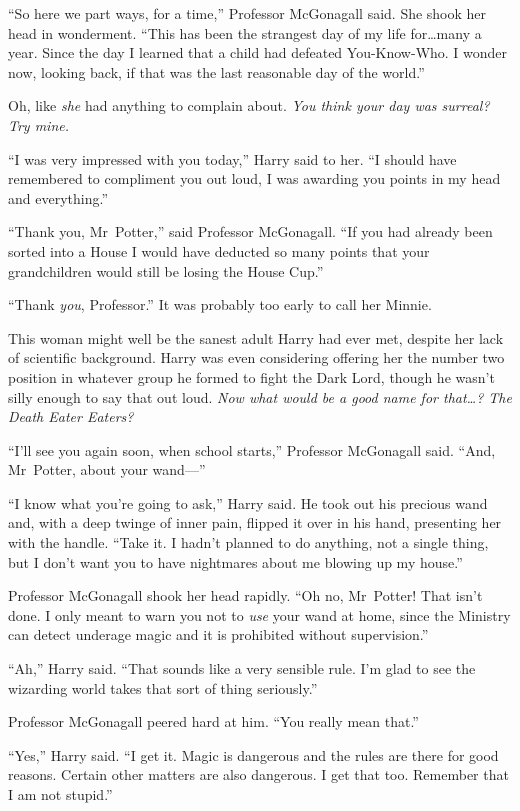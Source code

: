 “So here we part ways, for a time,” Professor McGonagall said. She shook her head in wonderment. “This has been the strangest day of my life for…many a year. Since the day I learned that a child had defeated You-Know-Who. I wonder now, looking back, if that was the last reasonable day of the world.”

Oh, like \emph{she} had anything to complain about. \emph{You think your day was surreal? Try mine.}

“I was very impressed with you today,” Harry said to her. “I should have remembered to compliment you out loud, I was awarding you points in my head and everything.”

“Thank you, Mr~Potter,” said Professor McGonagall. “If you had already been sorted into a House I would have deducted so many points that your grandchildren would still be losing the House Cup.”

“Thank \emph{you}, Professor.” It was probably too early to call her Minnie.

This woman might well be the sanest adult Harry had ever met, despite her lack of scientific background. Harry was even considering offering her the number two position in whatever group he formed to fight the Dark Lord, though he wasn’t silly enough to say that out loud. \emph{Now what would be a good name for that…? The Death Eater Eaters?}

“I’ll see you again soon, when school starts,” Professor McGonagall said. “And, Mr~Potter, about your wand—”

“I know what you’re going to ask,” Harry said. He took out his precious wand and, with a deep twinge of inner pain, flipped it over in his hand, presenting her with the handle. “Take it. I hadn’t planned to do anything, not a single thing, but I don’t want you to have nightmares about me blowing up my house.”

Professor McGonagall shook her head rapidly. “Oh no, Mr~Potter! That isn’t done. I only meant to warn you not to \emph{use} your wand at home, since the Ministry can detect underage magic and it is prohibited without supervision.”

“Ah,” Harry said. “That sounds like a very sensible rule. I’m glad to see the wizarding world takes that sort of thing seriously.”

Professor McGonagall peered hard at him. “You really mean that.”

“Yes,” Harry said. “I get it. Magic is dangerous and the rules are there for good reasons. Certain other matters are also dangerous. I get that too. Remember that I am not stupid.”

